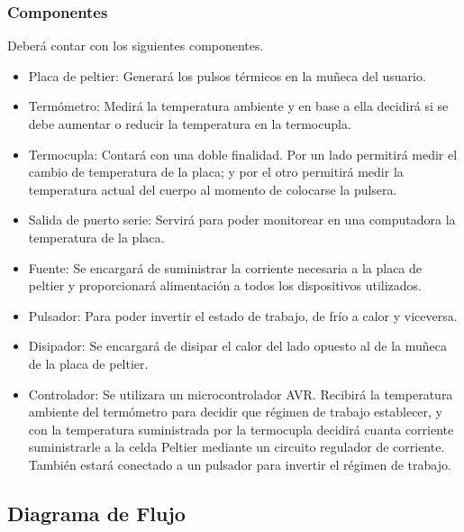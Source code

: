 \documentclass[10pt,spanish,a4paper,openany,notitlepage]{article}
\begin{document}
\subsubsection{Componentes}

Deberá contar con los siguientes componentes.

\begin{itemize}
\item{Placa de peltier:} Generará los pulsos térmicos en la muñeca del usuario.
\item{Termómetro:} Medirá la temperatura ambiente y en base a ella decidirá 
si se debe aumentar o reducir la temperatura en la termocupla.
\item{Termocupla:} Contará con una doble finalidad. Por un lado permitirá 
medir el cambio de temperatura de la placa; y por el otro permitirá medir 
la temperatura actual del cuerpo al momento de colocarse la pulsera.
\item{Salida de puerto serie:} Servirá para poder monitorear en una 
computadora la temperatura de la placa.
\item{Fuente:} Se encargará de suministrar la corriente necesaria a la 
placa de peltier y proporcionará alimentación a todos los dispositivos utilizados.
\item{Pulsador:} Para poder invertir el estado de trabajo, de frío a calor 
y viceversa.
\item{Disipador:} Se encargará de disipar el calor del lado opuesto al de 
la muñeca de la placa de peltier.
\item{Controlador:} Se utilizara un microcontrolador AVR. Recibirá la temperatura ambiente del termómetro
para decidir que régimen de trabajo establecer, y con la temperatura suministrada por la termocupla
decidirá cuanta corriente suministrarle a la celda Peltier mediante un circuito regulador de corriente.
También estará conectado a un pulsador para invertir el régimen de trabajo.
\end{itemize}

\subsection{Diagrama de Flujo}
\end{document}
